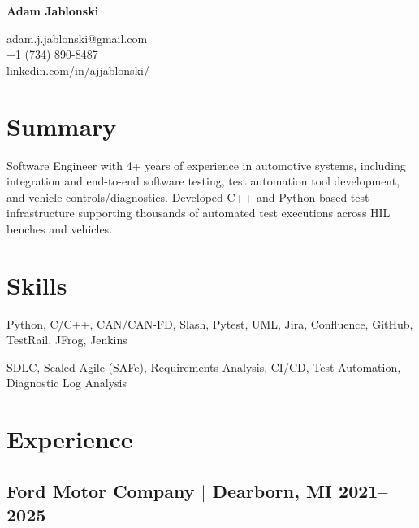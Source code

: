\documentclass[11pt]{article}
\begin{document}
\pagestyle{empty}

\begin{center}
  \begin{minipage}{0.45\textwidth}
    {\Huge\bfseries
      Adam Jablonski
    }
  \end{minipage} \hfill
  \begin{minipage}{0.5\textwidth}
    \raggedleft
    adam.j.jablonski@gmail.com \\
    +1 (734) 890-8487 \\
    linkedin.com/in/ajjablonski/
  \end{minipage}
\end{center}

\section{Summary}
\noindent 
Software Engineer with 4+ years of experience in automotive systems, including 
integration and end-to-end software testing, test automation tool development, and vehicle 
controls/diagnostics. Developed C++ and Python-based test infrastructure supporting 
thousands of automated test executions across HIL benches and vehicles.

\section{Skills}
\begin{description}[itemsep=0pt]
  \item[Tools] Python, C/C++, CAN/CAN-FD, Slash, Pytest, UML, Jira, Confluence, GitHub, TestRail, JFrog, Jenkins
  \item[Practices] SDLC, Scaled Agile (SAFe), Requirements Analysis, CI/CD, 
  Test Automation, Diagnostic Log Analysis
\end{description}

\section{Experience}
\subsection{Ford Motor Company $|$ {\normalfont Dearborn, MI} \hfill 2021--2025}
\end{document}
